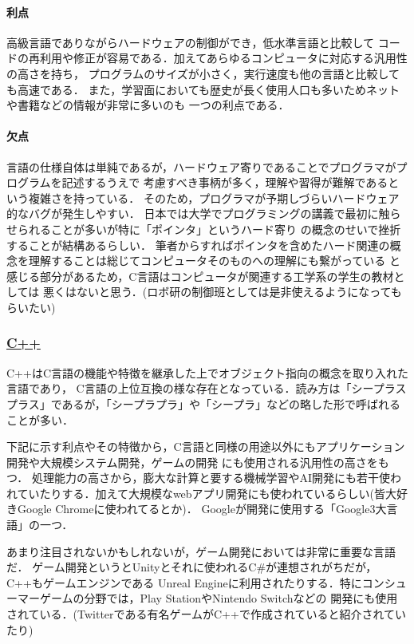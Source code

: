 \documentclass[autodetect-engine,dvi=dvipdfmx,ja=standard,a4j]{bxjsarticle}
\begin{document}
\paragraph*{利点}
高級言語でありながらハードウェアの制御ができ，低水準言語と比較して
コードの再利用や修正が容易である．加えてあらゆるコンピュータに対応する汎用性の高さを持ち，
プログラムのサイズが小さく，実行速度も他の言語と比較しても高速である．
また，学習面においても歴史が長く使用人口も多いためネットや書籍などの情報が非常に多いのも
一つの利点である．

\paragraph*{欠点}
言語の仕様自体は単純であるが，ハードウェア寄りであることでプログラマがプログラムを記述するうえで
考慮すべき事柄が多く，理解や習得が難解であるという複雑さを持っている．
そのため，プログラマが予期しづらいハードウェア的なバグが発生しやすい．
日本では大学でプログラミングの講義で最初に触らせられることが多いが特に「ポインタ」というハード寄り
の概念のせいで挫折することが結構あるらしい．
筆者からすればポインタを含めたハード関連の概念を理解することは総じてコンピュータそのものへの理解にも繋がっている
と感じる部分があるため，C言語はコンピュータが関連する工学系の学生の教材としては
悪くはないと思う．(ロボ研の制御班としては是非使えるようになってもらいたい)

\subsubsection*{\underline{\textbf{C++}}}
C++はC言語の機能や特徴を継承した上でオブジェクト指向の概念を取り入れた言語であり，
C言語の上位互換の様な存在となっている．読み方は「シープラスプラス」であるが，「シープラプラ」や「シープラ」などの略した形で呼ばれることが多い．

下記に示す利点やその特徴から，C言語と同様の用途以外にもアプリケーション開発や大規模システム開発，ゲームの開発
にも使用される汎用性の高さをもつ．
処理能力の高さから，膨大な計算と要する機械学習やAI開発にも若干使われていたりする．加えて大規模なwebアプリ開発にも使われているらしい(皆大好きGoogle Chromeに使われてるとか)．
Googleが開発に使用する「Google3大言語」の一つ．

あまり注目されないかもしれないが，ゲーム開発においては非常に重要な言語だ．
ゲーム開発というとUnityとそれに使われるC\#が連想されがちだが，C++もゲームエンジンである
Unreal Engineに利用されたりする．特にコンシューマーゲームの分野では，Play StationやNintendo Switchなどの
開発にも使用されている．(Twitterである有名ゲームがC++で作成されていると紹介されていたり)
\end{document}
